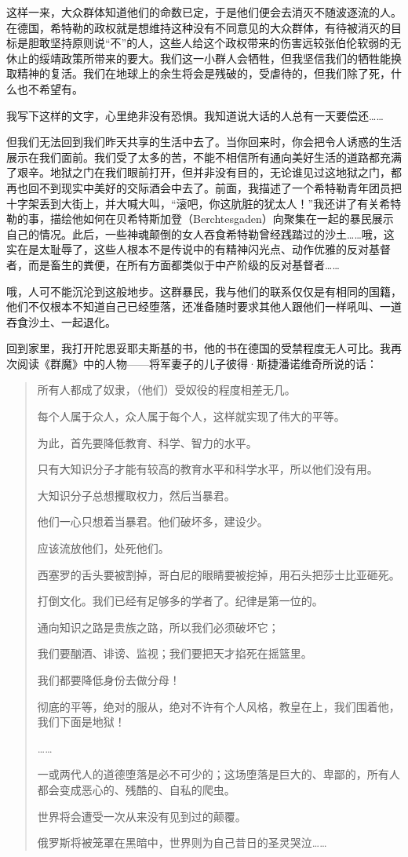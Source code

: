 \documentclass[UTF8]{ctexart}
\begin{document}
这样一来，大众群体知道他们的命数已定，于是他们便会去消灭不随波逐流的人。在德国，希特勒的政权就是想维持这种没有不同意见的大众群体，有待被消灭的目标是胆敢坚持原则说“不”的人，这些人给这个政权带来的伤害远较张伯伦软弱的无休止的绥靖政策所带来的要大。我们这一小群人会牺牲，但我坚信我们的牺牲能换取精神的复活。我们在地球上的余生将会是残破的，受虐待的，但我们除了死，什么也不希望有。

我写下这样的文字，心里绝非没有恐惧。我知道说大话的人总有一天要偿还……

但我们无法回到我们昨天共享的生活中去了。当你回来时，你会把令人诱惑的生活展示在我们面前。我们受了太多的苦，不能不相信所有通向美好生活的道路都充满了艰辛。地狱之门在我们眼前打开，但并非没有目的，无论谁见过这地狱之门，都再也回不到现实中美好的交际酒会中去了。前面，我描述了一个希特勒青年团员把十字架丢到大街上，并大喊大叫，“滚吧，你这肮脏的犹太人！”我还讲了有关希特勒的事，描绘他如何在贝希特斯加登（Berchtesgaden）向聚集在一起的暴民展示自己的情况。此后，一些神魂颠倒的女人吞食希特勒曾经践踏过的沙土……哦，这实在是太耻辱了，这些人根本不是传说中的有精神闪光点、动作优雅的反对基督者，而是畜生的粪便，在所有方面都类似于中产阶级的反对基督者……

哦，人可不能沉沦到这般地步。这群暴民，我与他们的联系仅仅是有相同的国籍，他们不仅根本不知道自己已经堕落，还准备随时要求其他人跟他们一样吼叫、一道吞食沙土、一起退化。

回到家里，我打开陀思妥耶夫斯基的书，他的书在德国的受禁程度无人可比。我再次阅读《群魔》中的人物——将军妻子的儿子彼得·斯捷潘诺维奇所说的话：

\begin{quote}
所有人都成了奴隶，（他们）受奴役的程度相差无几。

每个人属于众人，众人属于每个人，这样就实现了伟大的平等。

为此，首先要降低教育、科学、智力的水平。

只有大知识分子才能有较高的教育水平和科学水平，所以他们没有用。

大知识分子总想攫取权力，然后当暴君。

他们一心只想着当暴君。他们破坏多，建设少。

应该流放他们，处死他们。

西塞罗的舌头要被割掉，哥白尼的眼睛要被挖掉，用石头把莎士比亚砸死。

打倒文化。我们已经有足够多的学者了。纪律是第一位的。

通向知识之路是贵族之路，所以我们必须破坏它；

我们要酗酒、诽谤、监视；我们要把天才掐死在摇篮里。

我们都要降低身份去做分母！

彻底的平等，绝对的服从，绝对不许有个人风格，教皇在上，我们围着他，我们下面是地狱！

……

一或两代人的道德堕落是必不可少的；这场堕落是巨大的、卑鄙的，所有人都会变成恶心的、残酷的、自私的爬虫。

世界将会遭受一次从来没有见到过的颠覆。

俄罗斯将被笼罩在黑暗中，世界则为自己昔日的圣灵哭泣……
\end{quote}
\end{document}
